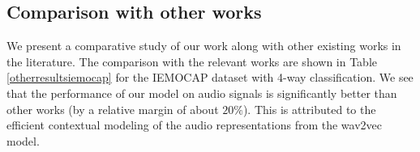 \documentclass[lettersize,journal]{IEEEtran}
\begin{document}
\begin{table}[t!]
\caption{\label{otherresultsiemocap6}Comparison with other works for IEMOCAP 6-way classification. All scores are the weighted F1 scores. * indicates our implementation.}
    \vspace{-0.1in}

\begin{center}


\end{center}
\end{table}



\subsection{Comparison with other works}
We present a comparative study of our work along with other existing works in the literature.
The comparison with the relevant works are shown in Table \ref{otherresultsiemocap} for the IEMOCAP dataset with 4-way classification. We see that the performance of our model on audio signals is significantly better than other works (by a relative margin of about $20\%$). This is attributed to the efficient contextual modeling of the audio representations from the wav2vec model.
\end{document}
